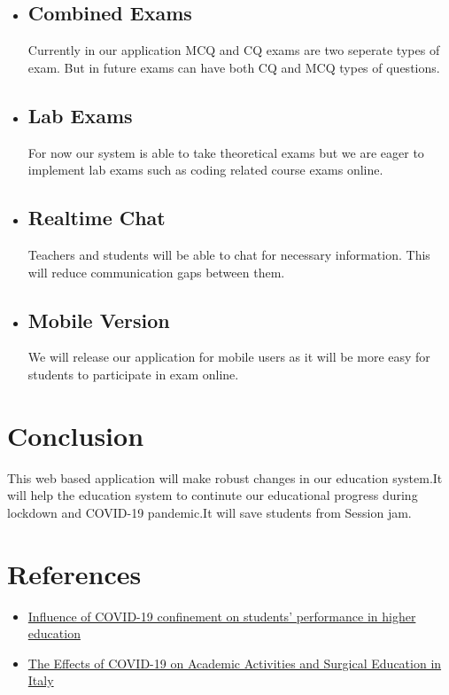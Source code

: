 \documentclass[10pt]{article}
\begin{document}
\begin{itemize}
  \item \subsection{Combined Exams} Currently in our application MCQ and CQ exams are two seperate types of exam. But in future exams can have both CQ  and  MCQ types of questions.
  \item \subsection{Lab Exams} For now our system is able to take theoretical exams  but we are eager to implement lab exams such as coding related course exams online.
  \item \subsection{Realtime Chat} Teachers and students will be able to chat for necessary information. This will reduce communication gaps between them.
  \item \subsection{Mobile Version} We will release our application for mobile users as it will be more easy for students to participate in exam online.
\end{itemize}

\section{Conclusion}

This web based application will make robust changes in our education system.It will help the education system to continute our educational progress during lockdown and COVID-19 pandemic.It will save students from Session jam.

\section{References}

\begin{itemize}
  \item \href{https://journals.plos.org/plosone/article?id=10.1371/journal.pone.0239490}{Influence of COVID-19 confinement on students’ performance in higher education}
  \item \href{https://www.tandfonline.com/doi/abs/10.1080/08941939.2020.1748147?journalCode=iivs20}{The Effects of COVID-19 on Academic Activities and Surgical Education in Italy}
\end{itemize}
\end{document}
